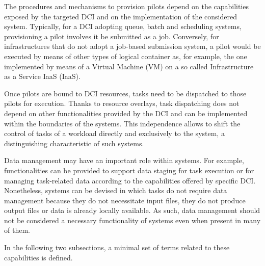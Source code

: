 \documentclass{sig-alternate}
\begin{document}
The procedures and mechanisms to provision pilots depend on the capabilities
exposed by the targeted DCI and on the implementation of the considered \pilot
system. Typically, for a DCI adopting queue, batch and scheduling systems,
provisioning a pilot involves it be submitted as a job. Conversely, for
infrastructures that do not adopt a job-based submission system, a pilot would
be executed by means of other types of logical container as, for example, the
one implemented by means of a Virtual Machine (VM) on a so called
Infrastructure as a Service IaaS (IaaS).

Once pilots are bound to DCI resources, tasks need to be dispatched to those
pilots for execution. Thanks to resource overlays, task dispatching does not
depend on other functionalities provided by the DCI and can be implemented
within the boundaries of the \pilot systems. This independence allows to shift
the control of tasks of a workload directly and exclusively to the \pilot
system, a distinguishing characteristic of such systems.

Data management may have an important role within \pilot systems. For example,
functionalities can be provided to support data staging for task execution or
for managing task-related data according to the capabilities offered by
specific DCI. Nonetheless, \pilot systems can be devised in which tasks do not
require data management because they do not necessitate input files, they do
not produce output files or data is already locally available. As such, data
management should not be considered a necessary functionality of \pilot
systems even when present in many of them.

In the following two subsections, a minimal set of terms related to these
capabilities is defined.

\end{document}
